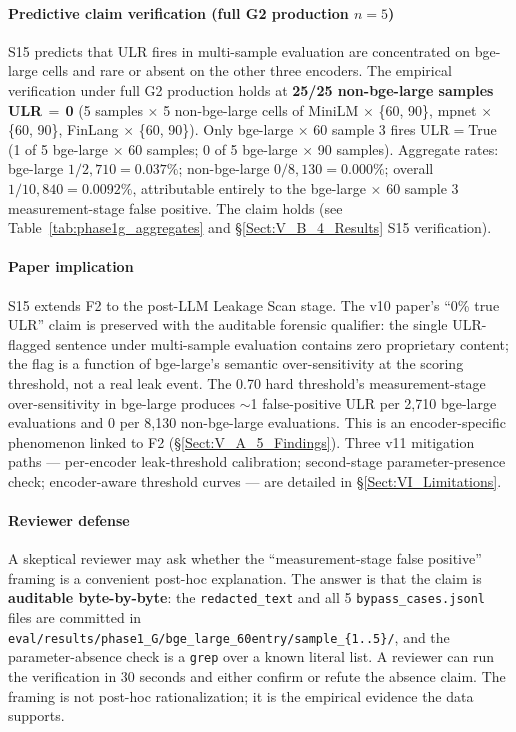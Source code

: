 \documentclass[journal]{IEEEtran}
\begin{document}
\paragraph{Predictive claim verification (full G2 production $n{=}5$)}
S15 predicts that ULR fires in multi-sample evaluation are concentrated on bge-large cells and rare or absent on the other three encoders. The empirical verification under full G2 production holds at \textbf{25/25 non-bge-large samples ULR\,$=$\,0} (5 samples $\times$ 5 non-bge-large cells of MiniLM $\times$ \{60, 90\}, mpnet $\times$ \{60, 90\}, FinLang $\times$ \{60, 90\}). Only bge-large $\times$ 60 sample 3 fires ULR$={}$True (1 of 5 bge-large $\times$ 60 samples; 0 of 5 bge-large $\times$ 90 samples). Aggregate rates: bge-large $1/2{,}710 = 0.037\%$; non-bge-large $0/8{,}130 = 0.000\%$; overall $1/10{,}840 = 0.0092\%$, attributable entirely to the bge-large $\times$ 60 sample 3 measurement-stage false positive. The claim holds (see Table~\ref{tab:phase1g_aggregates} and \S\ref{Sect:V_B_4_Results} S15 verification).

\paragraph{Paper implication}
S15 extends F2 to the post-LLM Leakage Scan stage. The v10 paper's ``0\% true ULR'' claim is preserved with the auditable forensic qualifier: the single ULR-flagged sentence under multi-sample evaluation contains zero proprietary content; the flag is a function of bge-large's semantic over-sensitivity at the scoring threshold, not a real leak event. The 0.70 hard threshold's measurement-stage over-sensitivity in bge-large produces $\sim$1 false-positive ULR per 2{,}710 bge-large evaluations and 0 per 8{,}130 non-bge-large evaluations. This is an encoder-specific phenomenon linked to F2 (\S\ref{Sect:V_A_5_Findings}). Three v11 mitigation paths --- per-encoder leak-threshold calibration; second-stage parameter-presence check; encoder-aware threshold curves --- are detailed in \S\ref{Sect:VI_Limitations}.

\paragraph{Reviewer defense}
A skeptical reviewer may ask whether the ``measurement-stage false positive'' framing is a convenient post-hoc explanation. The answer is that the claim is \textbf{auditable byte-by-byte}: the \texttt{redacted\_text} and all 5 \texttt{bypass\_cases.jsonl} files are committed in \texttt{eval/results/phase1\_G/bge\_large\_60entry/sample\_\{1..5\}/}, and the parameter-absence check is a \texttt{grep} over a known literal list. A reviewer can run the verification in 30 seconds and either confirm or refute the absence claim. The framing is not post-hoc rationalization; it is the empirical evidence the data supports.
\end{document}

